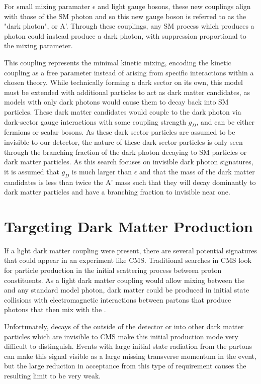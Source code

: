 For small mixing paramater $\epsilon$ and light gauge bosons, these new couplings align with those of the SM photon \cite{Bauer_2018} and so this new gauge boson is referred to as the "dark photon", or A'.
Through these couplings, any SM process which produces a photon could instead produce a dark photon, with suppression proportional to the mixing parameter.

This coupling represents the minimal kinetic mixing, encoding the kinetic coupling as a free parameter instead of arising from specific interactions within a chosen theory. 
While technically forming a dark sector on its own, this model must be extended with additional particles to act as dark matter candidates, as models with only dark photons would cause them to decay back into SM particles.
These dark matter candidates would couple to the dark photon via dark-sector gauge interactions with some coupling strength $g_D$, and can be either fermions or scalar bosons.
As these dark sector particles are assumed to be invisible to our detector, the nature of these dark sector particles is only seen through the branching fraction of the dark photon decaying to SM particles or dark matter particles.
As this search focuses on invisible dark photon signatures, it is assumed that $g_D$ is much larger than $\epsilon$ and that the mass of the dark matter candidates is less than twice the A' mass such that they will decay dominantly to dark matter particles and have a branching fraction to invisible near one.

\section{Targeting Dark Matter Production}
If a light dark matter coupling were present, there are several potential signatures that could appear in an experiment like CMS.
Traditional searches in CMS look for particle production in the initial scattering process between proton constituents.
As a light dark matter coupling would allow mixing between the \aprime and any standard model photon, dark matter could be produced in initial state collisions with electromagnetic interactions between partons that produce photons that then mix with the \aprime.

Unfortunately, decays of the \aprime outside of the detector or into other dark matter particles which are invisible to CMS make this initial production mode very difficult to distinguish.
Events with large initial state radiation from the partons can make this signal visible as a large missing transverse momentum in the event, but the large reduction in acceptance from this type of requirement causes the resulting limit to be very weak.

